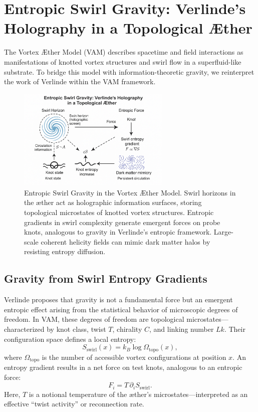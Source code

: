 \section{Entropic Swirl Gravity: Verlinde’s Holography in a Topological Æther}

The Vortex Æther Model (VAM) describes spacetime and field interactions as manifestations of knotted vortex structures and swirl flow in a superfluid-like substrate. To bridge this model with information-theoretic gravity, we reinterpret the work of Verlinde \cite{Verlinde2011,Verlinde2016} within the VAM framework.

\begin{figure}[h!]
\centering
\includegraphics[width=0.65\textwidth]{ErikVerlinde}
\caption{Entropic Swirl Gravity in the Vortex Æther Model.
Swirl horizons in the æther act as holographic information surfaces, storing topological microstates of knotted vortex structures. Entropic gradients in swirl complexity generate emergent forces on probe knots, analogous to gravity in Verlinde’s entropic framework. Large-scale coherent helicity fields can mimic dark matter halos by resisting entropy diffusion.}
\end{figure}

\subsection*{Gravity from Swirl Entropy Gradients}

Verlinde proposes that gravity is not a fundamental force but an emergent entropic effect arising from the statistical behavior of microscopic degrees of freedom. In VAM, these degrees of freedom are topological microstates—characterized by knot class, twist $T$, chirality $C$, and linking number $Lk$. Their configuration space defines a local entropy:
\begin{equation}
S_{\text{swirl}}(x) = k_B \log \Omega_{\text{topo}}(x),
\end{equation}
where $\Omega_{\text{topo}}$ is the number of accessible vortex configurations at position $x$. An entropy gradient results in a net force on test knots, analogous to an entropic force:
\begin{equation}
F_i = T \, \partial_i S_{\text{swirl}}.
\end{equation}
Here, $T$ is a notional temperature of the æther's microstates—interpreted as an effective “twist activity” or reconnection rate.

